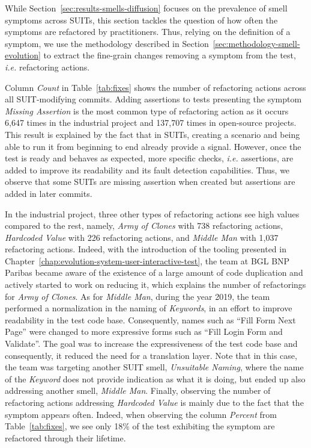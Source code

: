 While Section~\ref{sec:results-smells-diffusion} focuses on the prevalence of smell symptoms across SUITs, this section tackles the question of how often the symptoms are refactored by practitioners. Thus, relying on the definition of a symptom, we use the methodology described in Section~\ref{sec:methodology-smell-evolution} to extract the fine-grain changes removing a symptom from the test, \emph{i.e.} refactoring actions.

Column \emph{Count} in Table~\ref{tab:fixes} shows the number of refactoring actions across all SUIT-modifying commits. Adding assertions to tests presenting the symptom \emph{Missing Assertion} is the most common type of refactoring action as it occurs 6,647 times in the industrial project and 137,707 times in open-source projects. This result is explained by the fact that in SUITs, creating a scenario and being able to run it from beginning to end already provide a signal. However, once the test is ready and behaves as expected, more specific checks, \emph{i.e.} assertions, are added to improve its readability and its fault detection capabilities. Thus, we observe that some SUITs are missing assertion when created but assertions are added in later commits. 

In the industrial project, three other types of refactoring actions see high values compared to the rest, namely, \emph{Army of Clones} with 738 refactoring actions, \emph{Hardcoded Value} with 226 refactoring actions, and \emph{Middle Man} with 1,037 refactoring actions. Indeed, with the introduction of the tooling presented in Chapter~\ref{chap:evolution-system-user-interactive-test}, the team at BGL BNP Paribas became aware of the existence of a large amount of code duplication and actively started to work on reducing it, which explains the number of refactorings for \emph{Army of Clones}. As for \emph{Middle Man}, during the year 2019, the team performed a normalization in the naming of \emph{Keywords}, in an effort to improve readability in the test code base. Consequently, names such as ``Fill Form Next Page'' were changed to more expressive forms such as ``Fill Login Form and Validate''. The goal was to increase the expressiveness of the test code base and consequently, it reduced the need for a translation layer. Note that in this case, the team was targeting another SUIT smell, \emph{Unsuitable Naming}, where the name of the \emph{Keyword} does not provide indication as what it is doing, but ended up also addressing another smell, \emph{Middle Man}. Finally, observing the number of refactoring actions addressing \emph{Hardcoded Value} is mainly due to the fact that the symptom appears often. Indeed, when observing the column \emph{Percent} from Table~\ref{tab:fixes}, we see only 18\% of the test exhibiting the symptom are refactored through their lifetime. 

